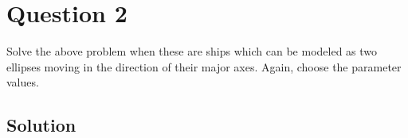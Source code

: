 \section*{Question 2}

Solve the above problem when these are ships which can be modeled as two ellipses moving in
the direction of their major axes.
Again, choose the parameter values.

\subsection*{Solution}

